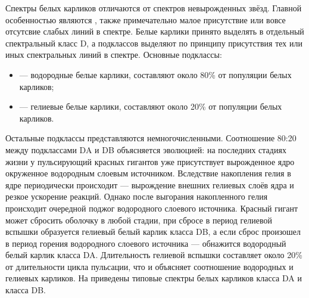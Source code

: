 Спектры белых карликов отличаются от спектров невырожденных звёзд. Главной особенностью являются , также примечательно малое присутствие или вовсе отсутсвие слабых линий в спектре. Белые карлики принято выделять в отдельный спектральный класс D, а подклассов выделяют по принципу присутствия тех или иных спектральных линий в спектре. Основные подклассы:
\begin{itemize}
	\item {} — водородные белые карлики, составляют около 80\% от популяции белых карликов;
	\item {} — гелиевые белые карлики, составляют около 20\% от популяции белых карликов.
\end{itemize}
Остальные подклассы представляются немногочисленными. Соотношение 80:20 между подклассами DA и DB объясняется эволюцией: на последних стадиях жизни у пульсирующий красных гигантов уже присутствует вырожденное ядро окруженное водородным слоевым источником. Вследствие накопления гелия в ядре периодически происходит  — вырождение внешних гелиевых слоёв ядра и резкое ускорение реакций. Однако после выгорания накопленного гелия происходит очередной поджог водородного слоевого источника. Красный гигант может сбросить оболочку в любой стадии, при сбросе в период гелиевой вспышки образуется гелиевый белый карлик класса DB, а если сброс произошел в период горения водородного слоевого источника — обнажится водородный белый карлик класса DA. Длительность гелиевой вспышки составляет около 20\% от длительности цикла пульсации, что и объясняет соотношение водородных и гелиевых карликов. На  приведены типовые спектры белых карликов класса DA и класса DB.


